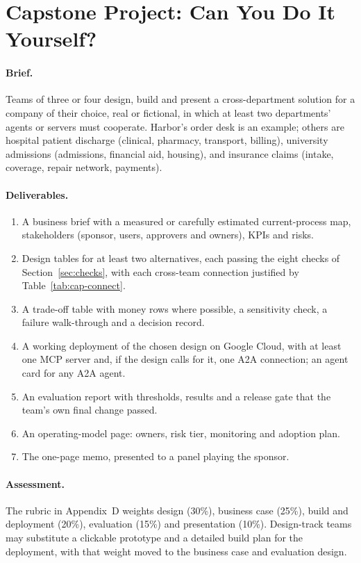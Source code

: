 \section{Capstone Project: Can You Do It Yourself?}
\label{sec:cap-project}

\paragraph{Brief.} Teams of three or four design, build and present a cross-department solution for a company of their choice, real or fictional, in which at least two departments' agents or servers must cooperate. Harbor's order desk is an example; others are hospital patient discharge (clinical, pharmacy, transport, billing), university admissions (admissions, financial aid, housing), and insurance claims (intake, coverage, repair network, payments).

\paragraph{Deliverables.}
\begin{enumerate}[itemsep=1pt]
  \item A business brief with a measured or carefully estimated current-process map, stakeholders (sponsor, users, approvers and owners), KPIs and risks.
  \item Design tables for at least two alternatives, each passing the eight checks of Section~\ref{sec:checks}, with each cross-team connection justified by Table~\ref{tab:cap-connect}.
  \item A trade-off table with money rows where possible, a sensitivity check, a failure walk-through and a decision record.
  \item A working deployment of the chosen design on Google Cloud, with at least one MCP server and, if the design calls for it, one A2A connection; an agent card for any A2A agent.
  \item An evaluation report with thresholds, results and a release gate that the team's own final change passed.
  \item An operating-model page: owners, risk tier, monitoring and adoption plan.
  \item The one-page memo, presented to a panel playing the sponsor.
\end{enumerate}

\paragraph{Assessment.} The rubric in Appendix~D weights design (30\%), business case (25\%), build and deployment (20\%), evaluation (15\%) and presentation (10\%). Design-track teams may substitute a clickable prototype and a detailed build plan for the deployment, with that weight moved to the business case and evaluation design.


